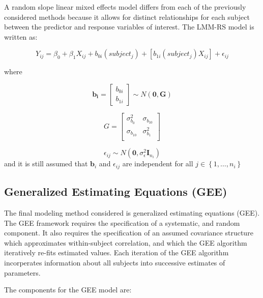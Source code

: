 \documentclass[12pt,]{article}
\begin{document}
A random slope linear mixed effects model differs from each of the
previously considered methods because it allows for distinct
relationships for each subject between the predictor and response
variables of interest. The LMM-RS model is written as:

\[Y_{ij} = \beta_{0} + \beta_{1} X_{ij} + b_{0i}\left(subject_{j}\right) + \left [ b_{1i}\left(subject_{j} \right) X_{ij}   \right ] + \epsilon_{ij}\]

where

\[\mathbf{b_{i}} = 
\begin{bmatrix}
b_{0i} \\
b_{1i}
\end{bmatrix} \sim 
N \left(\mathbf{0}, \mathbf{G} \right)\]

\[G=\begin{bmatrix}
\sigma_{b_{0}}^2 & \sigma_{b_{10}} \\
\sigma_{b_{10}} & \sigma_{b_{1}}^{2}\\
\end{bmatrix}\]

\[\epsilon_{ij} \sim N\left(\mathbf{0}, \sigma_{\epsilon}^{2}\mathbf{I}_{n_{i}} \right) \]
and it is still assumed that \(\mathbf{b}_{i}\) and \(\epsilon_{ij}\)
are independent for all \(j \in \left \{ 1, \ldots, n_{i} \right \}\)

\hypertarget{generalized-estimating-equations-gee}{%
\subsection{Generalized Estimating Equations
(GEE)}\label{generalized-estimating-equations-gee}}

The final modeling method considered is generalized estimating equations
(GEE). The GEE framework requires the specification of a systematic, and
random component. It also requires the specification of an assumed
covariance structure which approximates within-subject correlation, and
which the GEE algorithm iteratively re-fits estimated values. Each
iteration of the GEE algorithm incorperates information about all
subjects into successive estimates of parameters.

The components for the GEE model are:
\end{document}
